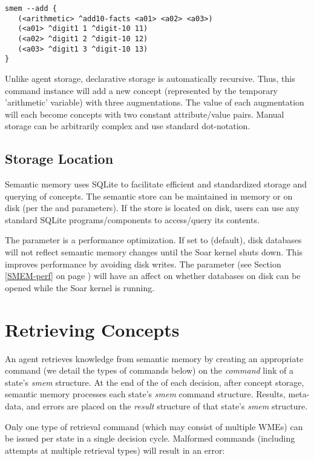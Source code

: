 \begin{verbatim}
smem --add {
   (<arithmetic> ^add10-facts <a01> <a02> <a03>)
   (<a01> ^digit1 1 ^digit-10 11)
   (<a02> ^digit1 2 ^digit-10 12)
   (<a03> ^digit1 3 ^digit-10 13)
}
\end{verbatim}

Unlike agent storage, declarative storage is automatically recursive.  Thus, this command instance will add a new concept (represented by the temporary 'arithmetic' variable) with three augmentations.  The value of each augmentation will each become concepts with two constant attribute/value pairs.  Manual storage can be arbitrarily complex and use standard dot-notation.

\subsection{Storage Location}
Semantic memory uses SQLite to facilitate efficient and standardized storage and querying of concepts.  The semantic store can be maintained in memory or on disk (per the  and  parameters).  If the store is located on disk, users can use any standard SQLite programs/components to access/query its contents. 

The  parameter is a performance optimization.  If set to  (default), disk databases will not reflect semantic memory changes until the Soar kernel shuts down. This improves performance by avoiding disk writes. The  parameter (see Section \ref{SMEM-perf} on page \pageref{SMEM-perf}) will have an affect on whether databases on disk can be opened while the Soar kernel is running.


\section{Retrieving Concepts}
\label{SMEM-retrieve}

An agent retrieves knowledge from semantic memory by creating an appropriate command (we detail the types of commands below) on the \emph{command} link of a state's \emph{smem} structure. At the end of the  of each decision, after concept storage, semantic memory processes each state's \emph{smem} command structure.  Results, meta-data, and errors are placed on the \emph{result} structure of that state's \emph{smem} structure.

Only one type of retrieval command (which may consist of multiple WMEs) can be issued per state in a single decision cycle.  Malformed commands (including attempts at multiple retrieval types) will result in an error:

